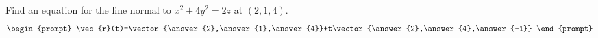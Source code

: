\documentclass{ximera}
\author{David Guichard \and Neal Koblitz \and H. Jerome Keisler \and Albert Scheller \and Barry Balof \and Mike Wills \and Matthew Carr}
\begin{document}
\begin{exercise}




Find an equation for the line normal to $x^2+4y^2=2z$ at $(2,1,4)$.
\[
\begin{prompt}
\vec{r}(t)=\vector{\answer{2},\answer{1},\answer{4}}+t\vector{\answer{2},\answer{4},\answer{-1}}
\end{prompt}
\]

\end{exercise}
\end{document}
